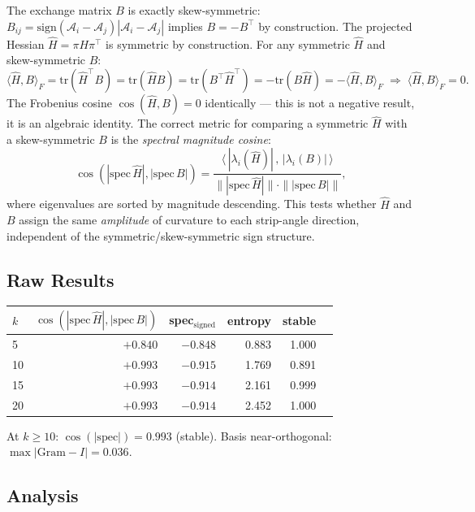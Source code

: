\documentclass[11pt]{amsart}
\begin{document}
The exchange matrix $B$ is exactly skew-symmetric:
$B_{ij} = \mathrm{sign}(\mathcal{A}_i - \mathcal{A}_j)
|\mathcal{A}_i - \mathcal{A}_j|$ implies $B = -B^\top$ by construction.
The projected Hessian $\hat{H} = \pi H \pi^\top$ is symmetric by
construction.
For any symmetric $\hat{H}$ and skew-symmetric $B$:
\[
  \langle \hat{H}, B \rangle_F
  = \mathrm{tr}(\hat{H}^\top B)
  = \mathrm{tr}(\hat{H} B)
  = \mathrm{tr}(B^\top \hat{H}^\top)
  = -\mathrm{tr}(B \hat{H})
  = -\langle \hat{H}, B\rangle_F
  \;\Rightarrow\;
  \langle \hat{H}, B\rangle_F = 0.
\]
The Frobenius cosine $\cos(\hat{H}, B) = 0$ identically --- this is
not a negative result, it is an algebraic identity.
The correct metric for comparing a symmetric $\hat{H}$ with a
skew-symmetric $B$ is the \emph{spectral magnitude cosine}:
\[
  \cos(|\mathrm{spec}\,\hat{H}|, |\mathrm{spec}\,B|)
  = \frac{\langle\, |\lambda_i(\hat{H})|\,,\,|\lambda_i(B)|\,\rangle}
         {\||\mathrm{spec}\,\hat{H}|\| \cdot \||\mathrm{spec}\,B|\|},
\]
where eigenvalues are sorted by magnitude descending.
This tests whether $\hat{H}$ and $B$ assign the same \emph{amplitude}
of curvature to each strip-angle direction, independent of the
symmetric/skew-symmetric sign structure.

\subsection{Raw Results}

\begin{center}
\small
\begin{tabular}{@{}lrrrrr@{}}
\toprule
$k$ & $\cos(|\mathrm{spec}\,\hat{H}|,|\mathrm{spec}\,B|)$
    & spec$_\mathrm{signed}$ & entropy & stable \\
\midrule
 5 & $+0.840$ & $-0.848$ & 0.883 & 1.000 \\
10 & $+0.993$ & $-0.915$ & 1.769 & 0.891 \\
15 & $+0.993$ & $-0.914$ & 2.161 & 0.999 \\
20 & $+0.993$ & $-0.914$ & 2.452 & 1.000 \\
\bottomrule
\end{tabular}
\end{center}

At $k \geq 10$: $\cos(|\mathrm{spec}|) = 0.993$ (stable).
Basis near-orthogonal: $\max|\mathrm{Gram}-I| = 0.036$.

\subsection{Analysis}
\end{document}
